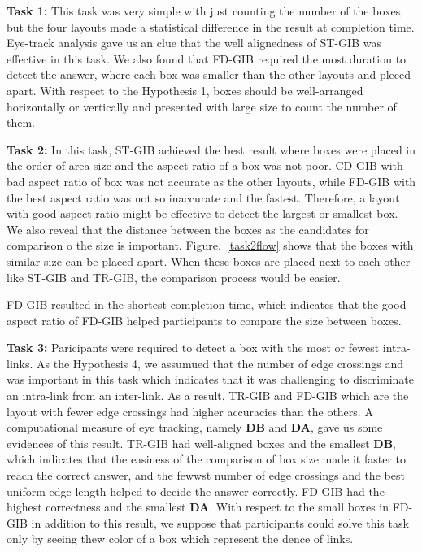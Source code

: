 \documentclass{vgtc}                          %
\begin{document}
{\bf Task 1:} This task was very simple with just counting the number of the boxes, but the four layouts made a statistical difference in the result at completion time.
Eye-track analysis gave us an clue that the well alignedness of ST-GIB was effective in this task.
We also found that FD-GIB required the most duration to detect the answer, where each box was smaller than the other layouts and pleced apart.
With respect to the Hypothesis 1, boxes should be well-arranged horizontally or vertically and presented with large size to count the number of them.

{\bf Task 2:} In this task, ST-GIB achieved the best result where boxes were placed in the order of area size and the aspect ratio of a box was not poor.
CD-GIB with bad aspect ratio of box was not accurate as the other layouts, while FD-GIB with the best aspect ratio was not so inaccurate and the fastest.
Therefore, a layout with good aspect ratio might be effective to detect the largest or smallest box.
We also reveal that the distance between the boxes as the candidates for comparison o the size is important.
Figure.~\ref{task2flow} shows that the boxes with similar size can be placed apart.
When these boxes are placed next to each other like ST-GIB and TR-GIB, the comparison process would be easier.

FD-GIB resulted in the shortest completion time, which indicates that the good aspect ratio of FD-GIB helped participants to compare the size between boxes.

{\bf Task 3:} Paricipants were required to detect a box with the most or fewest intra-links.
As the Hypothesis 4, we assumued that the number of edge crossings and was important in this task which indicates that it was challenging to discriminate an intra-link from an inter-link.
As a result, TR-GIB and FD-GIB which are the layout with fewer edge crossings had higher accuracies than the others.
A computational measure of eye tracking, namely {\bf DB} and {\bf DA}, gave us some evidences of this result.
TR-GIB had well-aligned boxes and the smallest {\bf DB}, which indicates that the easiness of the comparison of box size made it faster to reach the correct answer, and the fewwst number of edge crossings and the best uniform edge length helped to decide the answer correctly.
FD-GIB had the highest correctness and the smallest {\bf DA}.
With respect to the small boxes in FD-GIB in addition to this result, we suppose that participants could solve this task only by seeing thew color of a box which represent the dence of links.
\end{document}
